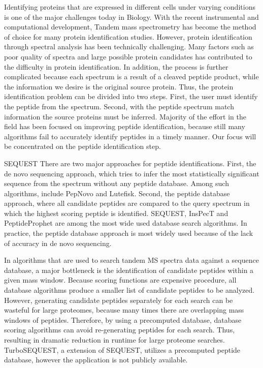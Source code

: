 \documentclass{bioinfo}
\begin{document}
Identifying proteins that are expressed in different cells under
varying conditions is one of the major challenges today in
Biology. With the recent instrumental and computational development,
Tandem mass spectrometry has become the method of choice for many
protein identification studies. However, protein identification
through spectral analysis has been technically challenging. Many
factors such as poor quality of spectra and large possible protein
candidates has contributed to the difficulty in protein
identification. In addition, the process is further complicated
because each spectrum is a result of a cleaved peptide product, while
the information we desire is the original source protein. Thus, the
protein identification problem can be divided into two steps. First,
the user must identify the peptide from the spectrum. Second, with the
peptide spectrum match information the source proteins must be
inferred. Majority of the effort in the field has been focused on
improving peptide identification, because still many algorithms fail
to accurately identify peptides in a timely manner. Our focus will be
concentrated on the peptide identification step.

SEQUEST\citep{eng:approach} There are two major approaches for peptide
identifications. First, the de novo sequencing approach, which tries
to infer the most statistically significant sequence from the spectrum
without any peptide database. Among such algorithms, include PepNovo
and Lutefisk. Second, the peptide database approach, where all
candidate peptides are compared to the query spectrum in which the
highest scoring peptide is identified. SEQUEST, InsPecT and
PeptideProphet are among the most wide used database search
algorithms. In practice, the peptide database approach is most widely
used because of the lack of accuracy in de novo sequencing.

In algorithms that are used to search tandem MS spectra data against a
sequence database, a major bottleneck is the identification of
candidate peptides within a given mass window. Because scoring
functions are expensive procedure, all database algorithms produce a
smaller list of candidate peptides to be analyzed. However, generating
candidate peptides separately for each search can be wasteful for
large proteomes, because many times there are overlapping mass windows
of peptides. Therefore, by using a precomputed database, database
scoring algorithms can avoid re-generating peptides for each
search. Thus, resulting in dramatic reduction in runtime for large
proteome searches. TurboSEQUEST, a extension of SEQUEST, utilizes a
precomputed peptide database, however the application is not publicly
available.
\end{document}
